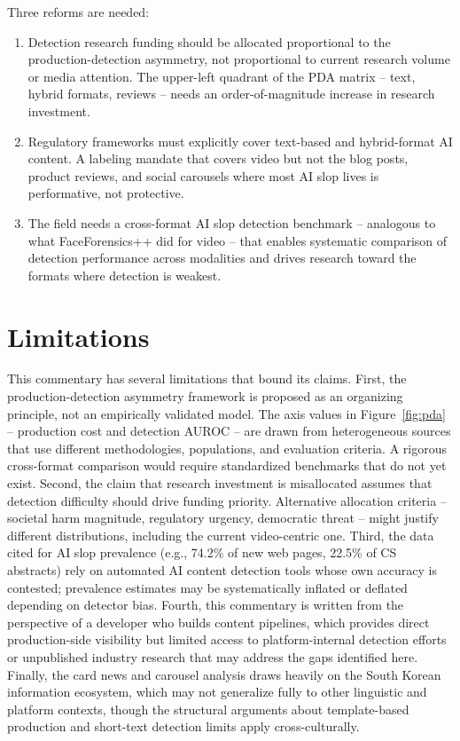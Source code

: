 \documentclass[12pt]{article}
\begin{document}
Three reforms are needed:
\begin{enumerate}[leftmargin=*]
    \item Detection research funding should be allocated proportional to the production-detection asymmetry, not proportional to current research volume or media attention. The upper-left quadrant of the PDA matrix -- text, hybrid formats, reviews -- needs an order-of-magnitude increase in research investment.
    \item Regulatory frameworks must explicitly cover text-based and hybrid-format AI content. A labeling mandate that covers video but not the blog posts, product reviews, and social carousels where most AI slop lives is performative, not protective.
    \item The field needs a cross-format AI slop detection benchmark -- analogous to what FaceForensics++ did for video -- that enables systematic comparison of detection performance across modalities and drives research toward the formats where detection is weakest.
\end{enumerate}

\section{Limitations}

This commentary has several limitations that bound its claims. First, the production-detection asymmetry framework is proposed as an organizing principle, not an empirically validated model. The axis values in Figure~\ref{fig:pda} -- production cost and detection AUROC -- are drawn from heterogeneous sources that use different methodologies, populations, and evaluation criteria. A rigorous cross-format comparison would require standardized benchmarks that do not yet exist. Second, the claim that research investment is misallocated assumes that detection difficulty should drive funding priority. Alternative allocation criteria -- societal harm magnitude, regulatory urgency, democratic threat -- might justify different distributions, including the current video-centric one. Third, the data cited for AI slop prevalence (e.g., 74.2\% of new web pages, 22.5\% of CS abstracts) rely on automated AI content detection tools whose own accuracy is contested; prevalence estimates may be systematically inflated or deflated depending on detector bias. Fourth, this commentary is written from the perspective of a developer who builds content pipelines, which provides direct production-side visibility but limited access to platform-internal detection efforts or unpublished industry research that may address the gaps identified here. Finally, the card news and carousel analysis draws heavily on the South Korean information ecosystem, which may not generalize fully to other linguistic and platform contexts, though the structural arguments about template-based production and short-text detection limits apply cross-culturally.
\end{document}
